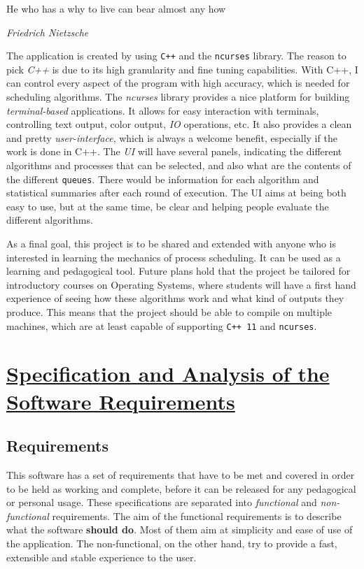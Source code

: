 \documentclass{article}
\newcommand{\code}[1]{\colorbox{codebg}{{\color{black}\texttt{#1}}}}
\begin{document}
\epigraph{He who has a why to live can bear almost any how}{\textit{Friedrich Nietzsche}}

The application is created by using \code{C++} and the \code{ncurses} library. The reason to pick \textit{C++} is due to its high granularity and fine tuning capabilities. With C++, I can control every aspect of the program with high accuracy, which is needed for scheduling algorithms. The \textit{ncurses} library provides a nice platform for building \textit{terminal-based} applications. It allows for easy interaction with terminals, controlling text output, color output, \textit{IO} operations, etc. It also provides a clean and pretty \textit{user-interface}, which is always a welcome benefit, especially if the work is done in C++. The \textit{UI} will have several panels, indicating the different algorithms and processes that can be selected, and also what are the contents of the different \code{queues}. There would be information for each algorithm and statistical summaries after each round of execution. The UI aims at being both easy to use, but at the same time, be clear and helping people evaluate the different algorithms.

As a final goal, this project is to be shared and extended with anyone who is interested in learning the mechanics of process scheduling. It can be used as a learning and pedagogical tool. Future plans hold that the project be tailored for introductory courses on Operating Systems, where students will have a first hand experience of seeing how these algorithms work and what kind of outputs they produce. This means that the project should be able to compile on multiple machines, which are at least capable of supporting \code{C++ 11} and \code{ncurses}.

\section{\underline{Specification and Analysis of the Software Requirements}}

\subsection{Requirements}

This software has a set of requirements that have to be met and covered in order to be held as working and complete, before it can be released for any pedagogical or personal usage. These specifications are separated into \textit{functional} and \textit{non-functional} requirements. The aim of the functional requirements is to describe what the software \textbf{should do}. Most of them aim at simplicity and ease of use of the application. The non-functional, on the other hand, try to provide a fast, extensible and stable experience to the user.
\end{document}
